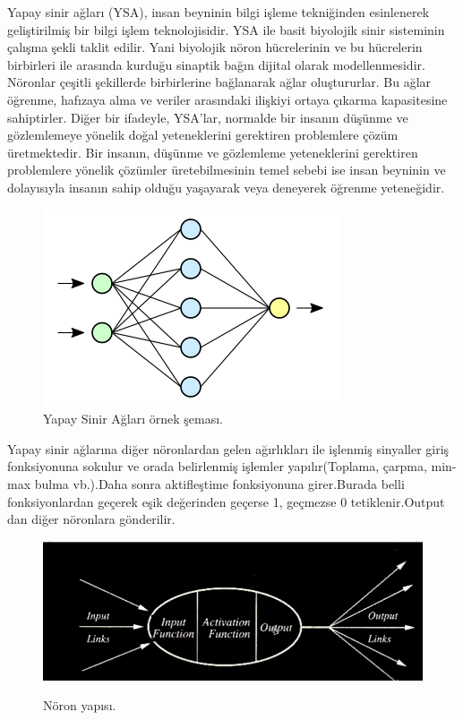 \documentclass[12pt, a4paper]{article}
\begin{document}
	Yapay sinir ağları (YSA), insan beyninin bilgi işleme tekniğinden esinlenerek geliştirilmiş bir bilgi işlem teknolojisidir. YSA ile basit biyolojik sinir sisteminin çalışma şekli taklit edilir. Yani biyolojik nöron hücrelerinin ve bu hücrelerin birbirleri ile arasında kurduğu sinaptik bağın dijital olarak modellenmesidir. Nöronlar çeşitli şekillerde birbirlerine bağlanarak ağlar oluştururlar. Bu ağlar öğrenme, hafızaya alma ve veriler arasındaki ilişkiyi ortaya çıkarma kapasitesine sahiptirler. Diğer bir ifadeyle, YSA'lar, normalde bir insanın düşünme ve gözlemlemeye yönelik doğal yeteneklerini gerektiren problemlere çözüm üretmektedir. Bir insanın, düşünme ve gözlemleme yeteneklerini gerektiren problemlere yönelik çözümler üretebilmesinin temel sebebi ise insan beyninin ve dolayısıyla insanın sahip olduğu yaşayarak veya deneyerek öğrenme yeteneğidir. \cite{wikipedia}
	
	\begin{figure}[!h]
		\centering
		\includegraphics{4.7.png}
		\caption{Yapay Sinir Ağları örnek şeması.}
	\end{figure}
	Yapay sinir ağlarına diğer nöronlardan gelen ağırlıkları ile işlenmiş sinyaller giriş fonksiyonuna sokulur ve orada belirlenmiş işlemler yapılır(Toplama, çarpma, min-max bulma vb.).Daha sonra aktifleştime fonksiyonuna girer.Burada belli fonksiyonlardan geçerek eşik değerinden geçerse 1, geçmezse 0 tetiklenir.Output dan diğer nöronlara gönderilir.
	\begin{figure}[!h]
		\centering
		\includegraphics{4.2.png}
		\caption{Nöron yapısı.}
		\cite{youtube}
	\end{figure}
	
\end{document}
